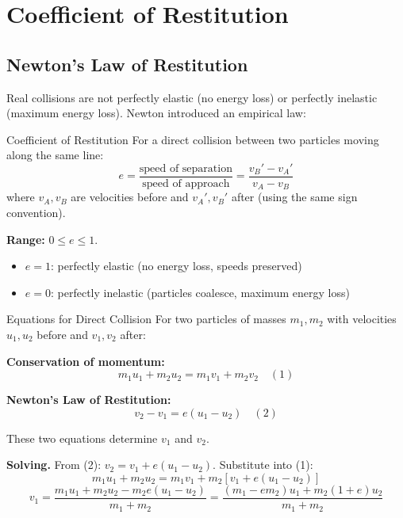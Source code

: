 \documentclass[12pt, a4paper]{book}
\begin{document}
\section{Coefficient of Restitution}

\subsection{Newton's Law of Restitution}

Real collisions are not perfectly elastic (no energy loss) or perfectly inelastic (maximum energy loss). Newton introduced an empirical law:

\begin{defn}{Coefficient of Restitution}{}
For a direct collision between two particles moving along the same line:
\[
  e = \frac{\text{speed of separation}}{\text{speed of approach}} = \frac{v_B' - v_A'}{v_A - v_B}
\]
where $v_A, v_B$ are velocities before and $v_A', v_B'$ after (using the same sign convention).

\textbf{Range:} $0 \leq e \leq 1$.
\begin{itemize}
  \item $e = 1$: perfectly elastic (no energy loss, speeds preserved)
  \item $e = 0$: perfectly inelastic (particles coalesce, maximum energy loss)
\end{itemize}
\end{defn}

\begin{thm}{Equations for Direct Collision}{}
For two particles of masses $m_1, m_2$ with velocities $u_1, u_2$ before and $v_1, v_2$ after:

\textbf{Conservation of momentum:}
\[
  m_1 u_1 + m_2 u_2 = m_1 v_1 + m_2 v_2 \quad (1)
\]

\textbf{Newton's Law of Restitution:}
\[
  v_2 - v_1 = e(u_1 - u_2) \quad (2)
\]

These two equations determine $v_1$ and $v_2$.
\end{thm}

\textbf{Solving.} From (2): $v_2 = v_1 + e(u_1-u_2)$. Substitute into (1):
\[
  m_1u_1 + m_2u_2 = m_1v_1 + m_2[v_1 + e(u_1-u_2)]
\]
\[
  v_1 = \frac{m_1u_1 + m_2u_2 - m_2e(u_1-u_2)}{m_1+m_2} = \frac{(m_1-em_2)u_1 + m_2(1+e)u_2}{m_1+m_2}
\]
\end{document}
